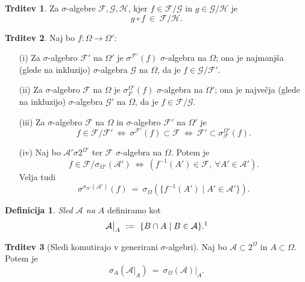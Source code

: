 \documentclass[11pt]{article}
\newcommand{\A}{\mathcal{A}}
\newcommand{\F}{\mathcal{F}}
\newcommand{\G}{\mathcal{G}}
\renewcommand{\H}{\mathcal{H}}
\newcommand{\set}[1]{\{#1\}}
\newcommand{\1}{\mathbbm{1}}
\theoremstyle{definition}
\newtheorem{definicija}{Definicija}[section]
\theoremstyle{definition}
\newtheorem{trditev}{Trditev}[section]
\theoremstyle{definition}
\theoremstyle{definition}
\begin{document}
\begin{trditev}

Za $\sigma$-algebre $\F,\G,\H$, kjer $f \in \F/\G$ in $g \in \G/\H$ je
$$g \circ f ~\in~ \F/\H.$$

\end{trditev}
\vspace{0.5cm}

\begin{trditev}

Naj bo $f: \Omega \rightarrow \Omega'$:
\begin{enumerate}

\item[(i)] Za $\sigma$-algebro $\F'$ na $\Omega'$ je $\sigma^{\F'}(f)$ $\sigma$-algebra na $\Omega$; ona je najmanjša (glede na inkluzijo) $\sigma$-algebra $\G$ na $\Omega$, da je $f \in \G/\F'$.

\item[(ii)] Za $\sigma$-algebro $\F$ na $\Omega$ je $\sigma_F^{\Omega'}(f)$ $\sigma$-algebra na $\Omega'$; ona je največja (glede na inkluzijo) $\sigma$-algebra $\G'$ na $\Omega$, da je $f \in \F/\G$.

\item[(iii)] Za $\sigma$-algebro $\F$ na $\Omega$ in $\sigma$-algebro $\F'$ na $\Omega'$ je
$$f \in \F/\F' ~\iff~ \sigma^{\F'}(f) \subset \F ~\iff~ \F' \subset \sigma_\F^{\Omega'}(f).$$

\item[(iv)] Naj bo $\A' \sigma 2^{\Omega'}$ ter $\F$ $\sigma$-algebra na $\Omega$. Potem je
$$f \in \F/\sigma_{\Omega'}(\A') ~\iff~ (f^{-1}(A') \in \F, ~\forall A' \in \A').$$
Velja tudi 
$$\sigma^{\sigma_{\Omega'}(\A')}(f) ~=~ \sigma_\Omega(\set{f^{-1}(A') \mid A' \in \A'}).$$

\end{enumerate}

\end{trditev}
\vspace{0.5cm}

\begin{definicija}

\textit{Sled $\A$ na $A$} definiramo kot
$$\A \big|_A ~:=~ \set{B \cap A \mid B \in \A}.\footnote{\text{Zapis je isti kot za zožitev, vendar ne pomeni isto.}}$$

\end{definicija}
\vspace{0.5cm}

\begin{trditev}[Sledi komutirajo v generirani $\sigma$-algebri]

Naj bo $\A \subset 2^\Omega$ in $A \subset \Omega$. Potem je
$$\sigma_A(\A \big|_A) ~=~ \sigma_\Omega(\A) \big|_A.$$

\end{trditev}
\vspace{0.5cm}
\end{document}
